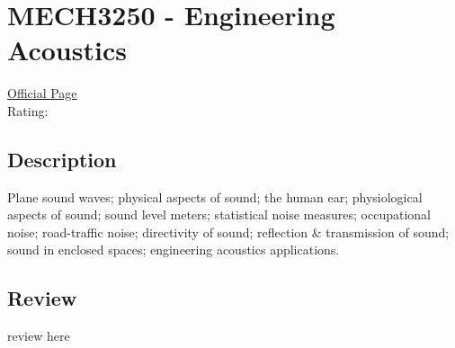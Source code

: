 \hypertarget{MECH3250}{\section{MECH3250 - Engineering Acoustics}}

\large
\textcolor{turbo_purple}{\href{https://my.uq.edu.au/programs-courses/course.html?course_code=MECH3250}{Official Page}} \\
Rating: \cstar\cstar\cstar\cstar\ostar

\normalsize
\subsection*{Description}
Plane sound waves; physical aspects of sound; the human ear; physiological aspects of sound; sound level meters; statistical noise measures; occupational noise; road-traffic noise; directivity of sound; reflection \& transmission of sound; sound in enclosed spaces; engineering acoustics applications.

\subsection*{Review}
review here
